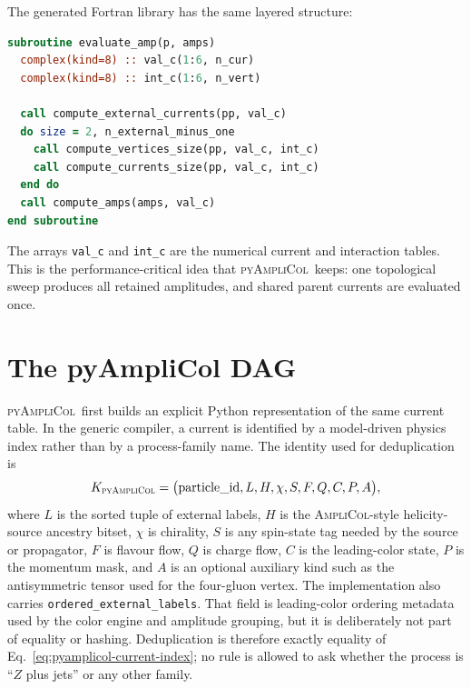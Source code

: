 \documentclass[10pt]{article}
\newcommand{\AC}{\textsc{AmpliCol}}
\newcommand{\PAC}{\textsc{pyAmpliCol}}
\begin{document}
The generated Fortran library has the same layered structure:
\begin{lstlisting}[language=Fortran]
subroutine evaluate_amp(p, amps)
  complex(kind=8) :: val_c(1:6, n_cur)
  complex(kind=8) :: int_c(1:6, n_vert)

  call compute_external_currents(pp, val_c)
  do size = 2, n_external_minus_one
    call compute_vertices_size(pp, val_c, int_c)
    call compute_currents_size(pp, val_c, int_c)
  end do
  call compute_amps(amps, val_c)
end subroutine
\end{lstlisting}
The arrays \texttt{val\_c} and \texttt{int\_c} are the numerical current and
interaction tables.  This is the performance-critical idea that \PAC\ keeps:
one topological sweep produces all retained amplitudes, and shared parent
currents are evaluated once.

\section{The pyAmpliCol DAG}

\PAC\ first builds an explicit Python representation of the same current table.
In the generic compiler, a current is identified by a model-driven physics
index rather than by a process-family name.  The identity used for
deduplication is
\begin{equation}
  K_{\PAC} =
  \bigl(
    \mathrm{particle\_id}, L, H, \chi, S, F, Q, C, P, A
  \bigr),
  \label{eq:pyamplicol-current-index}
\end{equation}
where $L$ is the sorted tuple of external labels, $H$ is the
\AC-style helicity-source ancestry bitset, $\chi$ is chirality, $S$ is any
spin-state tag needed by the source or propagator, $F$ is flavour flow, $Q$ is
charge flow, $C$ is the leading-color state, $P$ is the momentum mask, and $A$
is an optional auxiliary kind such as the antisymmetric tensor used for the
four-gluon vertex.  The implementation also carries
\texttt{ordered\_external\_labels}.  That field is leading-color ordering
metadata used by the color engine and amplitude grouping, but it is deliberately
not part of equality or hashing.  Deduplication is therefore exactly equality
of Eq.~\eqref{eq:pyamplicol-current-index}; no rule is allowed to ask whether
the process is ``$Z$ plus jets'' or any other family.
\end{document}
